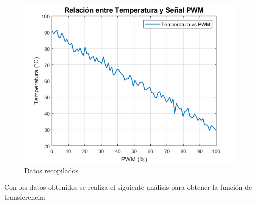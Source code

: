 \documentclass[12pt]{article}
\begin{document}
		\begin{figure}[h!]
			\label{fig:pwmvstemp}
			\includegraphics[width=1\linewidth]{Imagenes/pwm_vs_temp}
			\caption[Datos recopilados]{Datos recopilados}
		\end{figure}\newpage
		
		Con los datos obtenidos se realiza el siguiente análisis para obtener la función de transferencia:
		
\end{document}
